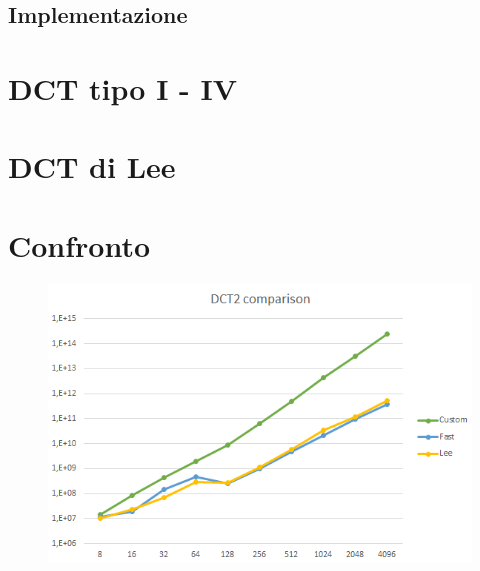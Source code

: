 \documentclass[a4paper,12pt]{report}
\begin{document}
\subsection*{Implementazione}

\section{DCT tipo I - IV}

\section{DCT di Lee}

\section{Confronto}
\begin{figure}[H]
\centering
\includegraphics[width=0.77\linewidth]{../img/comparison.png}
\label{fig:2}
\end{figure}
\end{document}
